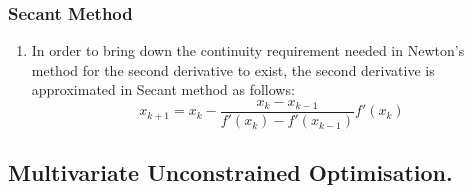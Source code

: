 \documentclass[12pt,a4paper,titlepage]{article}
\begin{document}
\subsubsection{Secant Method}
\begin{enumerate}
    \item In order to bring down the continuity requirement needed in Newton's method for the second derivative to exist, the second derivative is approximated in Secant method as follows: 
    \begin{equation}
   x_{k+1}= x_{k}-\frac{x_{k}-x_{k-1}}{f'(x_{k})-f'(x_{k-1})}f'(x_{k})
\end{equation}
\end{enumerate}

\subsection{Multivariate Unconstrained Optimisation.}
\end{document}
